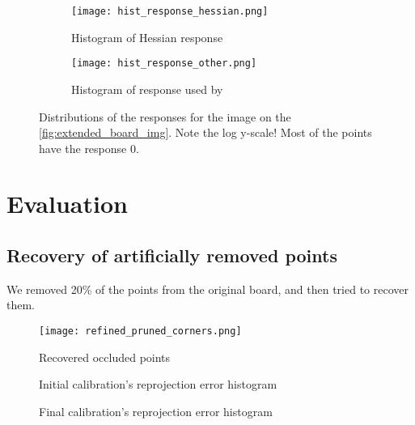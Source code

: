\begin{figure}
	\centering
	\begin{subfigure}[t]{\linewidth}
		\texttt{[image: hist\_response\_hessian.png]}
		\caption{Histogram of Hessian response}
	\end{subfigure}
	\begin{subfigure}[t]{\linewidth}
		\texttt{[image: hist\_response\_other.png]}
		\caption{Histogram of response used by \cite{geigerAutomaticCameraRange2012}}
	\end{subfigure}
	\caption{Distributions of the responses for the image on the
		\cref{fig:extended_board_img}. Note the log y-scale! Most of the points have
		the response 0.}
\end{figure}

\section{Evaluation}\label{sec:evaluation}

\subsection{Recovery of artificially removed points}\label{sub:recovery_of_artificially_removed_points}

We removed 20\% of the points from the original board, and then tried to recover
them.

\begin{figure}
  \texttt{[image: refined\_pruned\_corners.png]}
  \caption{Recovered occluded points}
\end{figure}

\begin{figure}[h]
	\caption{Initial calibration's reprojection error histogram}
\end{figure}
\begin{figure}[h]
	\caption{Final calibration's reprojection error histogram}
\end{figure}

